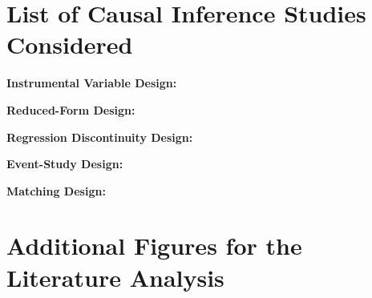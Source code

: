 \documentclass[12pt]{article}
\begin{document}
	



\pagebreak

\singlespacing
\setlength\bibsep{0pt}


\onehalfspacing

\pagebreak




\appendix

	\section{List of Causal Inference Studies Considered} \label{causal_lit}
	\setcounter{figure}{0}
	\renewcommand\thefigure{\thesection.\arabic{figure}}   

	\singlespacing
	\noindent\textbf{Instrumental Variable Design:} \cite{moretti_pollution_2011, ebenstein_particulate_2015, schwartz_estimating_2015, arceo_does_2016, he_effect_2016,
	knittel_caution_2016, schlenker_airports_2016, sheldon_impact_2017, schwartz_estimating_2017, zhong_traffic_2017, barwick_morbidity_2018, hanlon2018london,
	schwartz_national_2018, halliday_vog_2019, deryugina_mortality_2019, cheung_mitigating_2020, fan_impact_2020, he_straw_2020, giaccherini_when_2021,
	godzinski_disentangling_2021, guidetti_placebo_2021, kim_air_2021, liu_effect_2021, xia_short-term_2022}
	
	\noindent\textbf{Reduced-Form Design:} \cite{bauernschuster_when_2017, jans_economic_2018, jia_is_2019, godzinski2019short}
	
	\noindent\textbf{Regression Discontinuity Design:} \cite{chen_air_2018, fan_winter_2020, anderson2022bounds}
	
	\noindent\textbf{Event-Study Design:} \cite{mullins_effects_2015, simeonova_congestion_2021}
	
	\noindent\textbf{Matching Design:} \cite{baccini_assessing_2017, forastiere_assessing_2020}
	
	\onehalfspacing
	
\section{Additional Figures for the Literature Analysis} \label{addiional_figures}
\end{document}
